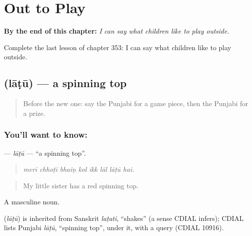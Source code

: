 
\chapter{Out to Play}
\label{ch:pa-a2-out-to-play}

\begin{chapteropening}
\textbf{By the end of this chapter:} \emph{I can say what children like to play outside.}

Complete the last lesson of chapter 353: I can say what children like to play outside.
\end{chapteropening}

\section[\texorpdfstring{\pa{ਲਾਟੂ} (lāṭū)}{ਲਾਟੂ (lāṭū)}]{ (lāṭū) — a spinning top}

\label{lesson:PA-C353-latu}



\begin{quote}
Before the new one: say the Punjabi for a game piece, then the Punjabi for a prize.
\end{quote}

\subsection*{You'll want to know: }
\textbf{} — \emph{lāṭū} — \textquotedblleft{}a spinning top\textquotedblright{}.

\begin{quote}
       
\end{quote}

\begin{quote}
\emph{merī chhoṭī bhaiṇ kol ikk lāl lāṭū hai.}
\end{quote}

\begin{quote}
My little sister has a red spinning top.
\end{quote}

A masculine noun.

\begin{cousinweb}
\textbf{} (\emph{lāṭū}) is inherited from Sanskrit \emph{laṭati}, \textquotedblleft{}shakes\textquotedblright{} (a sense CDIAL infers); CDIAL lists Punjabi \emph{lāṭū}, \textquotedblleft{}spinning top\textquotedblright{}, under it, with a query (CDIAL 10916).
\end{cousinweb}


